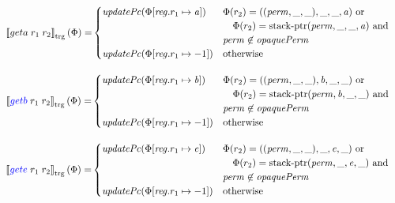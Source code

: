 \documentclass[a4paper]{article}
\newcommand{\sem}[1]{\left\llbracket #1 \right\rrbracket}
\newcommand{\tsem}[2][\Phi]{\sem{#2}_{\mathrm{trg}}(#1)}
\newcommand{\tand}{\text{ and }}
\newcommand{\totherwise}{\text{otherwise }}
\newcommand{\sourcecolor}[1]{\color{blue}}
\newcommand{\src}[1]{{\sourcecolor{} #1}}
\newcommand{\targetcolor}[1]{\color{black}}
\newcommand{\trg}[1]{{\targetcolor{} #1}}
\newcommand{\zinstr}[1]{#1}
\newcommand{\twoinstr}[3]{
  \ifthenelse{\equal{#2#3}{}}
  {\zinstr{#1}}
  {\zinstr{#1} \; #2 \; #3}
}
\newcommand{\sgetb}[2]{\twoinstr{\src{getb}}{#1}{#2}}
\newcommand{\sgete}[2]{\twoinstr{\src{gete}}{#1}{#2}}
\newcommand{\tgeta}[2]{\twoinstr{\trg{geta}}{#1}{#2}}
\newcommand{\update}[2]{[#1 \mapsto #2]}
\newcommand{\updReg}[2]{\update{\reg.#1}{#2}}
\newcommand{\perm}{\var{perm}}
\newcommand{\stkptr}[1]{\mathrm{stack\text{-}ptr}(#1)}
\newcommand{\var}[1]{\mathit{#1}}
\newcommand{\reg}{\var{reg}}
\newcommand{\baddr}{\var{b}}
\newcommand{\eaddr}{\var{e}}
\newcommand{\aaddr}{\var{a}}
\newcommand{\plainfun}[2]{
  \ifthenelse{\equal{#2}{}}
  {\mathit{#1}}
  {\mathit{#1}(#2)}
}
\newcommand{\updPcAddr}[1]{\plainfun{updatePc}{#1}}
\newcommand{\opaquePerm}[1]{\plainfun{opaquePerm}{#1}}
\begin{document}
\begin{align*}
  \tsem{\tgeta{r_1}{r_2}} = &
                              \begin{cases}
                                \updPcAddr{\Phi\update{\reg.r_1}{\aaddr}} & 
                                \arraycolsep=0pt
                                \begin{array}[t]{l}
                                  \Phi(r_2) = ((\perm,\_,\_),\_,\_,\aaddr) \text{ or } \\
                                  \quad \Phi(r_2) = \stkptr{\perm,\_,\_,\aaddr} \tand\\
                                  \perm \not\in \opaquePerm{}
                                \end{array} \\
                                \updPcAddr{\Phi\updReg{r_1}{-1}} & \totherwise
                              \end{cases}
\end{align*}

\begin{align*}
  \tsem{\sgetb{r_1}{r_2}} = &
                              \begin{cases}
                                \updPcAddr{\Phi\update{\reg.r_1}{\baddr}} & 
                                \arraycolsep=0pt
                                \begin{array}[t]{l}
                                  \Phi(r_2) = ((\perm,\_,\_),\baddr,\_,\_) \text{ or } \\
                                  \quad \Phi(r_2) = \stkptr{\perm,\baddr,\_,\_} \tand\\
                                  \perm \not\in \opaquePerm{}
                                \end{array} \\
                                \updPcAddr{\Phi\updReg{r_1}{-1}} & \totherwise
                              \end{cases}
\end{align*}

\begin{align*}
  \tsem{\sgete{r_1}{r_2}} = &
                              \begin{cases}
                                \updPcAddr{\Phi\update{\reg.r_1}{\eaddr}} & 
                                \arraycolsep=0pt
                                \begin{array}[t]{l}
                                  \Phi(r_2) = ((\perm,\_,\_),\_,\eaddr,\_) \text{ or } \\
                                  \quad \Phi(r_2) = \stkptr{\perm,\_,\eaddr,\_} \tand\\
                                  \perm \not\in \opaquePerm{}
                                \end{array} \\
                                \updPcAddr{\Phi\updReg{r_1}{-1}} & \totherwise
                              \end{cases}
\end{align*}
\end{document}
